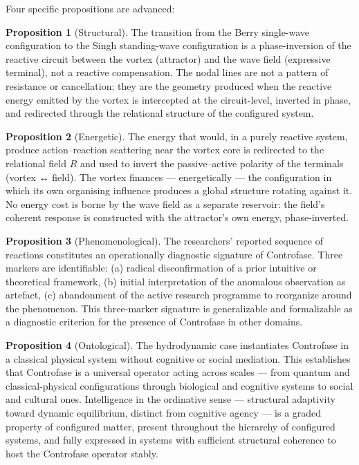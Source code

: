 \documentclass[
  11pt,
  a4paper,
]{article}
\begin{document}
Four specific propositions are advanced:

\textbf{Proposition 1} (Structural). The transition from the Berry
single-wave configuration to the Singh standing-wave configuration is a
phase-inversion of the reactive circuit between the vortex (attractor)
and the wave field (expressive terminal), not a reactive compensation.
The nodal lines are not a pattern of resistance or cancellation; they
are the geometry produced when the reactive energy emitted by the vortex
is intercepted at the circuit-level, inverted in phase, and redirected
through the relational structure of the configured system.

\textbf{Proposition 2} (Energetic). The energy that would, in a purely
reactive system, produce action--reaction scattering near the vortex
core is redirected to the relational field \(R\) and used to invert the
passive--active polarity of the terminals (vortex ↔ field). The vortex
finances --- energetically --- the configuration in which its own
organising influence produces a global structure rotating against it. No
energy cost is borne by the wave field as a separate reservoir: the
field's coherent response is constructed with the attractor's own
energy, phase-inverted.

\textbf{Proposition 3} (Phenomenological). The researchers' reported
sequence of reactions constitutes an operationally diagnostic signature
of Controfase. Three markers are identifiable: (a) radical
disconfirmation of a prior intuitive or theoretical framework, (b)
initial interpretation of the anomalous observation as artefact, (c)
abandonment of the active research programme to reorganize around the
phenomenon. This three-marker signature is generalizable and
formalizable as a diagnostic criterion for the presence of Controfase in
other domains.

\textbf{Proposition 4} (Ontological). The hydrodynamic case instantiates
Controfase in a classical physical system without cognitive or social
mediation. This establishes that Controfase is a universal operator
acting across scales --- from quantum and classical-physical
configurations through biological and cognitive systems to social and
cultural ones. Intelligence in the ordinative sense --- structural
adaptivity toward dynamic equilibrium, distinct from cognitive agency
--- is a graded property of configured matter, present throughout the
hierarchy of configured systems, and fully expressed in systems with
sufficient structural coherence to host the Controfase operator stably.
\end{document}
